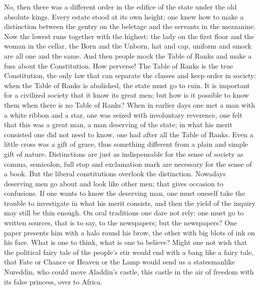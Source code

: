\documentclass[12pt,a4paper,openany]{book}
\newcommand{\opage}[1]{\marginnote{\footnotesize\textit{[#1]}}}
\begin{document}
No, then there was a different order in the edifice of the state
under the old absolute kings. Every estate stood
at its own height; one knew how to make a distinction between
the gentry on the beletage and the servants in the mezzanine.
Now the lowest runs together with the highest:
the lady on the first floor and the woman in the cellar, the Born and
the Unborn, hat and cap, uniform and smock are all one and the same. And then people mock the Table of Ranks and
make a fuss about the Constitution. How perverse! The Table of Ranks
is the true Constitution, the only
law that can separate the classes and keep order in society:
when the Table of Ranks is abolished, the state must
\setcounter{footnote}{0}%
\opage{56}go to ruin. It is important for a civilized society
that it know its great men; but how is it
possible to know them when there is no Table of Ranks?
When in earlier days one met a man with
a white ribbon and a star, one was seized with involuntary
reverence, one felt that this was a great man,
a man deserving of the state; in what his merit
consisted one did not need to know, one had after all
the Table of Ranks. Even a little cross was a gift of grace,
thus something different from a plain and simple gift of nature.
Distinctions are just as indispensable for the sense of
society as comma, semicolon, full stop and exclamation mark
are necessary for the sense of a book. But
the liberal constitutions overlook the distinction. Nowadays
deserving men go about and look like
other men; that gives occasion to confusions.
If one wants to know the deserving man, one must oneself
take the trouble to investigate in what his merit
consists, and then the yield of the inquiry may still
be thin enough. On oral traditions one dare
not rely: one must go to written sources, that
is to say, to the newspapers; but the newspapers? One paper
presents him with a halo round his brow, the
other with big blots of ink on his face. What is one to
think, what is one to believe? Might one not
wish that the political fairy tale of the people's stir would end with
a bang like a fairy tale, that Fate or Chance or
Heaven or the Lamp would send us a statesmanlike
Nureddin, who could move Aladdin's castle, this castle in the air
of freedom with its false princess, over
to Africa.
\end{document}
